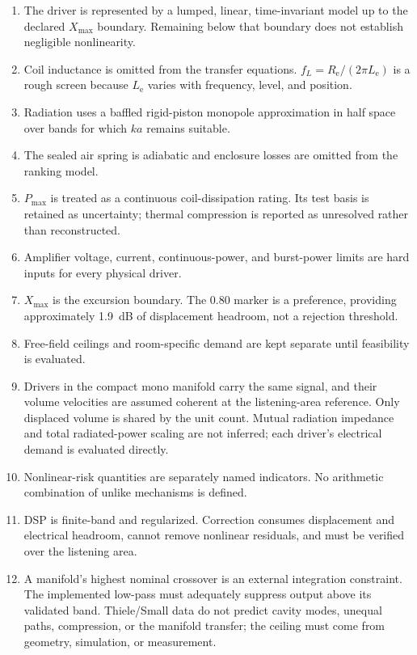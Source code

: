 \documentclass[11pt,a4paper]{article}
\numberwithin{equation}{section}
\newcommand{\Xmax}{X_{\mathrm{max}}}
\renewcommand{\Re}{R_{\mathrm{e}}}
\newcommand{\Le}{L_{\mathrm{e}}}
\newcommand{\Pmax}{P_{\mathrm{max}}}
\begin{document}
\begin{enumerate}
	\item[A1.] The driver is represented by a lumped, linear,
	time-invariant model up to the declared $\Xmax$ boundary.  Remaining
	below that boundary does not establish negligible nonlinearity.
	\item[A2.] Coil inductance is omitted from the transfer equations.
	$f_L=\Re/(2\pi\Le)$ is a rough screen because $\Le$ varies with
	frequency, level, and position.
	\item[A3.] Radiation uses a baffled rigid-piston monopole approximation
	in half space over bands for which $ka$ remains suitable.
	\item[A4.] The sealed air spring is adiabatic and enclosure losses are
	omitted from the ranking model.
	\item[A5.] $\Pmax$ is treated as a continuous coil-dissipation rating.
	Its test basis is retained as uncertainty; thermal compression is
	reported as unresolved rather than reconstructed.
	\item[A6.] Amplifier voltage, current, continuous-power, and burst-power
	limits are hard inputs for every physical driver.
	\item[A7.] $\Xmax$ is the excursion boundary.  The $0.80$ marker is a
	preference, providing approximately \SI{1.9}{dB} of displacement
	headroom, not a rejection threshold.
	\item[A8.] Free-field ceilings and room-specific demand are kept
	separate until feasibility is evaluated.
	\item[A9.] Drivers in the compact mono manifold carry the same signal,
	and their volume velocities are assumed coherent at the listening-area
	reference.  Only displaced volume is shared by the unit count.  Mutual
	radiation impedance and total radiated-power scaling are not inferred;
	each driver's electrical demand is evaluated directly.
	\item[A10.] Nonlinear-risk quantities are separately named indicators.
	No arithmetic combination of unlike mechanisms is defined.
	\item[A11.] DSP is finite-band and regularized.  Correction consumes
	displacement and electrical headroom, cannot remove nonlinear residuals,
	and must be verified over the listening area.
	\item[A12.] A manifold's highest nominal crossover is an external
	integration constraint.  The implemented low-pass must adequately
	suppress output above its validated band.  Thiele/Small data do not
	predict cavity modes, unequal paths, compression, or the manifold
	transfer; the ceiling must come from geometry, simulation, or
	measurement.
\end{enumerate}
\end{document}
